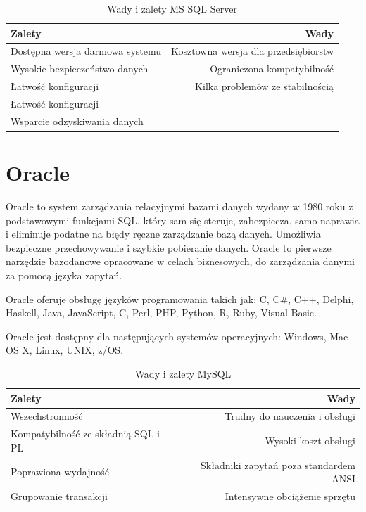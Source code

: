 \documentclass[oneside,polski,logo,indent]{amuthesis}
\begin{document}
\begin{table}[H]
\caption{Wady i zalety MS SQL Server}
\label{tabela-MS SQL Server}
\centering
\begin{adjustbox}{width=1\textwidth}
\small
\begin{tabular}{lr}
\toprule
Zalety & Wady\\
\midrule
Dostępna wersja darmowa systemu & Kosztowna wersja dla przedsiębiorstw\\
Wysokie bezpieczeństwo danych & Ograniczona kompatybilność\\
Łatwość konfiguracji & Kilka problemów ze stabilnością\\
Łatwość konfiguracji & \\
Wsparcie odzyskiwania danych & \\
\bottomrule
\end{tabular}
\end{adjustbox}
\end{table}
\section{Oracle}
Oracle to system zarządzania relacyjnymi bazami danych wydany w 1980 roku z podstawowymi funkcjami SQL, który sam się steruje, zabezpiecza, samo naprawia i eliminuje podatne na błędy ręczne zarządzanie bazą danych. Umożliwia bezpieczne przechowywanie i szybkie pobieranie danych. Oracle to pierwsze narzędzie bazodanowe opracowane w celach biznesowych, do zarządzania danymi za pomocą języka zapytań. 

Oracle oferuje obsługę języków programowania takich jak: C, C\#, C++, Delphi, Haskell, Java, JavaScript, C, Perl, PHP, Python, R, Ruby, Visual Basic.

Oracle jest dostępny dla następujących systemów operacyjnych: Windows, Mac OS X, Linux, UNIX, z/OS.
\begin{table}[H]
\caption{Wady i zalety MySQL}
\label{tabela-Oracle}
\centering
\begin{adjustbox}{width=1\textwidth}
\small
\begin{tabular}{lr}
\toprule
Zalety & Wady\\
\midrule
Wszechstronność & Trudny do nauczenia i obsługi\\
Kompatybilność ze składnią SQL i PL & Wysoki koszt obsługi\\
Poprawiona wydajność & Składniki zapytań poza standardem ANSI \\
Grupowanie transakcji & Intensywne obciążenie sprzętu\\
\bottomrule
\end{tabular}
\end{adjustbox}
\end{table}
\end{document}
